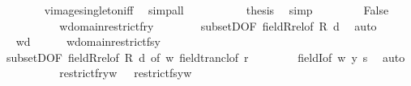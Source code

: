 \begin{isabellebody}
\ \ \ \ \ \ \isamarkupfalse%
\ vimage{\isacharunderscore}{\kern0pt}singleton{\isacharunderscore}{\kern0pt}iff\ \isamarkupfalse%
\ simp{\isacharunderscore}{\kern0pt}all\isanewline
\ \ \ \ \isamarkupfalse%
\isanewline
\ \ \ \ \isamarkupfalse%
\ {\isacharquery}{\kern0pt}thesis\ \isamarkupfalse%
\ simp\isanewline
\ \ \isamarkupfalse%
\isanewline
\ \ \ \ \isamarkupfalse%
\ False\isanewline
\ \ \ \ \isamarkupfalse%
\isanewline
\ \ \ \ \isamarkupfalse%
\ {\isachardoublequoteopen}w{\isasymnotin}domain{\isacharparenleft}{\kern0pt}restrict{\isacharparenleft}{\kern0pt}f{\isacharcomma}{\kern0pt}{\isacharquery}{\kern0pt}r{\isacharminus}{\kern0pt}{\isacharbackquote}{\kern0pt}{\isacharbackquote}{\kern0pt}{\isacharbraceleft}{\kern0pt}y{\isacharbraceright}{\kern0pt}{\isacharparenright}{\kern0pt}{\isacharparenright}{\kern0pt}{\isachardoublequoteclose}\isanewline
\ \ \ \ \ \ \isamarkupfalse%
\ subsetD{\isacharbrackleft}{\kern0pt}OF\ field{\isacharunderscore}{\kern0pt}Rrel{\isacharbrackleft}{\kern0pt}of\ R\ d{\isacharbrackright}{\kern0pt}{\isacharbrackright}{\kern0pt}\ \isamarkupfalse%
\ auto\isanewline
\ \ \ \ \isamarkupfalse%
\ \isamarkupfalse%
\ {\isacartoucheopen}w{\isasymnotin}d{\isacartoucheclose}\isanewline
\ \ \ \ \isamarkupfalse%
\ {\isachardoublequoteopen}w{\isasymnotin}domain{\isacharparenleft}{\kern0pt}restrict{\isacharparenleft}{\kern0pt}f{\isacharcomma}{\kern0pt}{\isacharquery}{\kern0pt}s{\isacharminus}{\kern0pt}{\isacharbackquote}{\kern0pt}{\isacharbackquote}{\kern0pt}{\isacharbraceleft}{\kern0pt}y{\isacharbraceright}{\kern0pt}{\isacharparenright}{\kern0pt}{\isacharparenright}{\kern0pt}{\isachardoublequoteclose}\isanewline
\ \ \ \ \ \ \isamarkupfalse%
\ subsetD{\isacharbrackleft}{\kern0pt}OF\ field{\isacharunderscore}{\kern0pt}Rrel{\isacharbrackleft}{\kern0pt}of\ R\ d{\isacharbrackright}{\kern0pt}{\isacharcomma}{\kern0pt}\ of\ w{\isacharbrackright}{\kern0pt}\ field{\isacharunderscore}{\kern0pt}trancl{\isacharbrackleft}{\kern0pt}of\ {\isacharquery}{\kern0pt}r{\isacharbrackright}{\kern0pt}\isanewline
\ \ \ \ \ \ \ \ fieldI{}{\isacharbrackleft}{\kern0pt}of\ w\ y\ {\isacharquery}{\kern0pt}s{\isacharbrackright}{\kern0pt}\ \isamarkupfalse%
\ auto\isanewline
\ \ \ \ \isamarkupfalse%
\isanewline
\ \ \ \ \isamarkupfalse%
\ {\isachardoublequoteopen}restrict{\isacharparenleft}{\kern0pt}f{\isacharcomma}{\kern0pt}{\isacharquery}{\kern0pt}r{\isacharminus}{\kern0pt}{\isacharbackquote}{\kern0pt}{\isacharbackquote}{\kern0pt}{\isacharbraceleft}{\kern0pt}y{\isacharbraceright}{\kern0pt}{\isacharparenright}{\kern0pt}{\isacharbackquote}{\kern0pt}w\ {\isacharequal}{\kern0pt}\ {}{\isachardoublequoteclose}\ {\isachardoublequoteopen}restrict{\isacharparenleft}{\kern0pt}f{\isacharcomma}{\kern0pt}{\isacharquery}{\kern0pt}s{\isacharminus}{\kern0pt}{\isacharbackquote}{\kern0pt}{\isacharbackquote}{\kern0pt}{\isacharbraceleft}{\kern0pt}y{\isacharbraceright}{\kern0pt}{\isacharparenright}{\kern0pt}{\isacharbackquote}{\kern0pt}w\ {\isacharequal}{\kern0pt}\ {}{\isachardoublequoteclose}\isanewline

\end{isabellebody}
